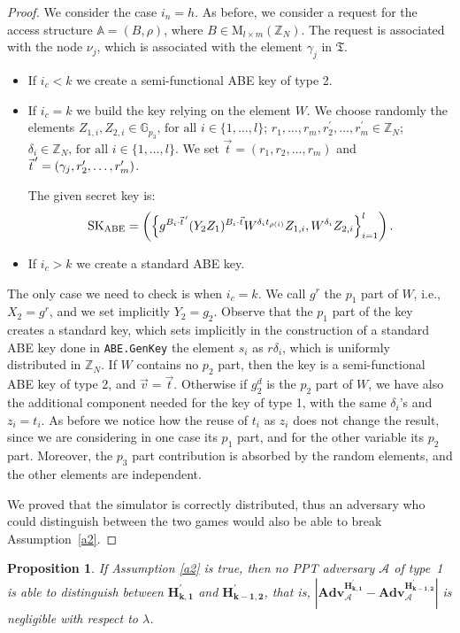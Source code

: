 \documentclass[a4paper,10pt]{article}
\newtheorem{proposition}{Proposition}
\newcommand{\G}{\mathbb{G}}
\newcommand{\Z}{\mathbb{Z}}
\newcommand{\adv}{\textbf{Adv}}
\newcommand{\tree}{\mathfrak{T}}
\newcommand{\varRow}{l}
\newcommand{\varColumn}{m}
\newcommand{\pvec}[2][]{{\hspace{-0.05em}\vec{\hspace{0.05em}#2}\mkern2mu\vphantom{#2}}^\prime_{\hspace{-0.18em}#1}}
\newcommand{\matrixset}[3]{\text{M}_{#1\times #2}(#3)}
\newcommand{\algorithm}[2]{\texttt{#1.#2}}
\newcommand{\randomchoose}[1]{We choose randomly the element\ifstrequal{#1}{s}{}{s} }
\newcommand{\game}[2]{$\mathbf{#1_{#2}}$}
\newcommand{\mathgame}[2]{\mathbf{#1_{#2}}}
\newcommand{\typeone}{type~1}
\begin{document}
	\begin{proof}
		We consider the case $i_n=h$.
		As before, we consider a request for the access structure $\mathbb{A}=(B,\rho)$, where $B\in\matrixset{\varRow}{\varColumn}{\Z_N}$. The request is associated with the node $\nu_j$, which is associated with the element $\gamma_j$ in $\tree$.
		\begin{itemize}
			\item
			If $i_c<k$ we create a semi-functional ABE key of type 2.
			\item
			If $i_c=k$ we build the key relying on the element $W$.
			\randomchoose{p}{$Z_{1,i},Z_{2,i}\in\G_{p_3}\text{, for all }i\in \{1,\ldots,\varRow\}$;
				$r_{1},\ldots,r_{\varColumn},r^\prime_{2},\ldots,r^\prime_{\varColumn}\in \Z_N$;
				$\delta_i\in\Z_N\text{, for all }i\in \{1,\ldots,\varRow\}$.
			}
			We set $\vec{t}=(r_1,r_{2},\ldots,r_{\varColumn})$ and $\pvec{t}=(\gamma_j,r^\prime_{2},\ldots,r^\prime_{\varColumn})$.
			
			The given secret key is:
			\[
				\mathrm{SK}_\textnormal{ABE}=\left( \left\{ g^{B_i\cdot \pvec{t}} (Y_2 Z_1)^{B_i\cdot\vec{t}}W^{\delta_i t_{\rho(i)}} Z_{1,i}, W^{\delta_i}Z_{2,i} \right\}_{i=1}^{\varRow} \right).
			\]
			\item
			If $i_c>k$ we create a standard ABE key.
		\end{itemize}
		The only case we need to check is when $i_c=k$.
		We call $g^r$ the $p_1$ part of $W$, i.e., $X_2=g^r$, and we set implicitly $Y_2=g_2$.
		Observe that the $p_1$ part of the key creates a standard key, which sets implicitly in the construction of a standard ABE key done in \algorithm{ABE}{GenKey} the element $s_i$ as $r \delta_i$, which is uniformly distributed in $\Z_N$.
		If $W$ contains no $p_2$ part, then the key is a semi-functional ABE key of type 2, and $\vec{v}=\vec{t}$.
		Otherwise if $g_2^d$ is the $p_2$ part of $W$, we have also the additional component needed for the key of type 1, with the same $\delta_i$'s and $z_i=t_i$.
		As before we notice how the reuse of $t_i$ as $z_i$ does not change the result, since we are considering in one case its $p_1$ part, and for the other variable its $p_2$ part.
		Moreover, the $p_3$ part contribution is absorbed by the random elements, and the other elements are independent.
		
		We proved that the simulator is correctly distributed, thus an adversary who could distinguish between the two games would also be able to break Assumption~\ref{a2}.
	\end{proof}
	\begin{proposition}
		\label{prop.h3}
		If Assumption \ref{a2} is true, then no PPT adversary $\mathcal{A}$ of \typeone{} is able to distinguish between \game{H^\prime}{k,1} and \game{H^\prime}{k-1,2}, that is, $\left| \adv_{\mathcal{A}}^{\mathgame{H^\prime}{k,1}} - \adv_{\mathcal{A}}^{\mathgame{H^\prime}{k-1,2}}\right|$ is negligible with respect to $\lambda$.
	\end{proposition}
\end{document}
